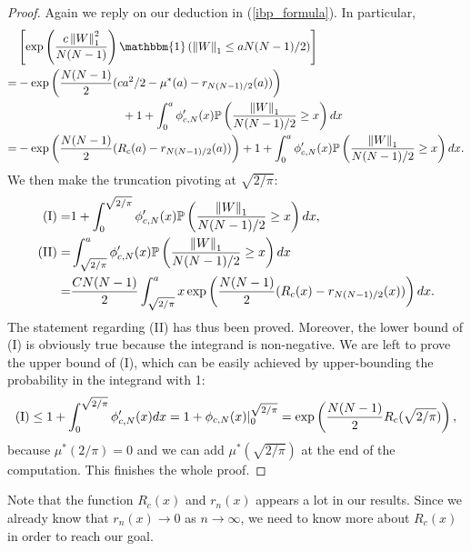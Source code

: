 \documentclass[10pt]{article}
\newcommand{\p}{\mathbb{P}}
\newcommand{\norm}[1]{\left\lVert#1\right\rVert}
\newenvironment{Proof of lemma}{\noindent{\bf Proof of Lemma}}{\hfill$\Box$\newline}
\newenvironment{Proof of claim}{\noindent{\bf Proof of claim}}{\hfill$\Box$\newline}
\newenvironment{Proof of theorem}{\noindent{\bf Proof of Theorem}}{\hfill\scriptsize{$\Box$}\newline}
\newenvironment{Proof of theorems}{\noindent{\bf Proof of Theorems}}{\hfill$\Box$\newline}
\newenvironment{Proof of proposition}{\noindent{\bf Proof of Proposition}}{\hfill$\Box$\newline}
\newenvironment{Proof of propositions}{\noindent{\bf Proof of Propositions}}{\hfill$\Box$\newline}
\newenvironment{Proof of exercise}{\noindent{\it Proof of Exercise:}}{\hfill$\Box$}
\numberwithin{equation}{section}
\begin{document}
\begin{proof}
    Again we reply on our deduction in (\ref{ibp_formula}). In particular,
    \begin{align}
        &\left[ \exp \left(\frac{c\norm{W}^2_1}{N(N-1)}\right) \mathbbm{1}\left(\norm{W}_1 \leq aN(N-1)/2\right)\right]  \nonumber \\
        =& -\exp\left(\frac{N(N-1)}{2}(ca^2/2-\mu^*(a)-r_{N(N-1)/2}(a))\right) \nonumber \\
        &\quad \quad \quad \quad \quad \quad \quad \quad \quad+1+ \int_{0}^{a} \phi_{c,N}'(x) \p\left(\frac{\norm{W}_1}{N(N-1)/2} \geq x \right)dx \nonumber \\
        =& -\exp\left(\frac{N(N-1)}{2}(R_c(a)-r_{N(N-1)/2}(a))\right) + 1 + \int_{0}^{a} \phi_{c,N}'(x) \p\left(\frac{\norm{W}_1}{N(N-1)/2} \geq x \right)dx.
    \end{align}
    We then make the truncation pivoting at $\sqrt{2/\pi}$:
    \begin{align}
        \text{\normalfont (I)} =& 1 + \int_{0}^{\sqrt{2/\pi}} \phi_{c,N}'(x) \p\left(\frac{\norm{W}_1}{N(N-1)/2} \geq x \right)dx, \\
        \text{\normalfont (II)} =& \int_{\sqrt{2/\pi}}^a \phi_{c,N}'(x) \p\left(\frac{\norm{W}_1}{N(N-1)/2} \geq x \right)dx \nonumber \\
        =&\frac{CN(N-1)}{2}\int_{\sqrt{2/\pi}}^{a}x \exp\left(\frac{N(N-1)}{2}(R_c(x)-r_{N(N-1)/2}(x))\right)dx.
    \end{align}
    The statement regarding (II) has thus been proved. Moreover, the lower bound of (I) is obviously true because the integrand is non-negative. We are left to prove the upper bound of (I), which can be easily achieved by upper-bounding the probability in the integrand with 1:
    \begin{align}
        \text{\normalfont (I)} \leq 1+ \int_{0}^{\sqrt{2/\pi}} \phi_{c,N}'(x) dx = 1 + \phi_{c,N}(x) |_{0}^{\sqrt{2/\pi}} = \exp\left(\frac{N(N-1)}{2}R_c(\sqrt{2/ \pi})\right),
    \end{align}
    because $\mu^*(2/ \pi) = 0$ and we can add $\mu^*(\sqrt{2/ \pi})$ at the end of the computation. This finishes the whole proof.
\end{proof}
Note that the function $R_c(x)$ and $r_n(x)$ appears a lot in our results. Since we already know that $r_n(x) \to 0$ as $n \to \infty$, we need to know more about $R_c(x)$ in order to reach our goal.
\end{document}
